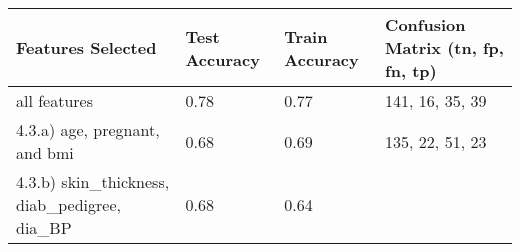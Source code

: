 \documentclass[11pt]{article}
\begin{document}
\begin{longtable}[]{@{}llll@{}}
\toprule
\begin{minipage}[b]{0.22\columnwidth}\raggedright
Features Selected\strut
\end{minipage} & \begin{minipage}[b]{0.22\columnwidth}\raggedright
Test Accuracy\strut
\end{minipage} & \begin{minipage}[b]{0.22\columnwidth}\raggedright
Train Accuracy\strut
\end{minipage} & \begin{minipage}[b]{0.22\columnwidth}\raggedright
Confusion Matrix (tn, fp, fn, tp)\strut
\end{minipage}\tabularnewline
\midrule
\endhead
\begin{minipage}[t]{0.22\columnwidth}\raggedright
all features\strut
\end{minipage} & \begin{minipage}[t]{0.22\columnwidth}\raggedright
0.78\strut
\end{minipage} & \begin{minipage}[t]{0.22\columnwidth}\raggedright
0.77\strut
\end{minipage} & \begin{minipage}[t]{0.22\columnwidth}\raggedright
141, 16, 35, 39\strut
\end{minipage}\tabularnewline
\begin{minipage}[t]{0.22\columnwidth}\raggedright
4.3.a) age, pregnant, and bmi\strut
\end{minipage} & \begin{minipage}[t]{0.22\columnwidth}\raggedright
0.68\strut
\end{minipage} & \begin{minipage}[t]{0.22\columnwidth}\raggedright
0.69\strut
\end{minipage} & \begin{minipage}[t]{0.22\columnwidth}\raggedright
135, 22, 51, 23\strut
\end{minipage}\tabularnewline
\begin{minipage}[t]{0.22\columnwidth}\raggedright
4.3.b) skin\_thickness, diab\_pedigree, dia\_BP\strut
\end{minipage} & \begin{minipage}[t]{0.22\columnwidth}\raggedright
0.68\strut
\end{minipage} & \begin{minipage}[t]{0.22\columnwidth}\raggedright
0.64\strut

\end{minipage}
\end{longtable}
\end{document}
